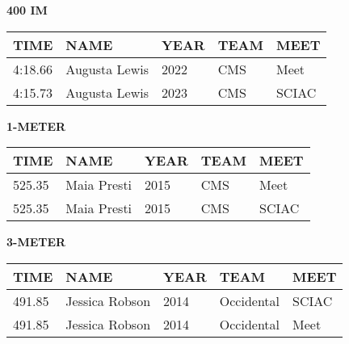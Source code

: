 \begin{table}[H]
\centering
\begin{minipage}[t]{0.6\textwidth}
\centering
\textbf{400 IM}\\[0.1cm]
\begin{tabular}{@{}p{1.8cm}p{2.8cm}p{1.2cm}p{1.4cm}p{1.4cm}@{}}
\hline
    \textbf{TIME} & \textbf{NAME} & \textbf{YEAR} & \textbf{TEAM} & \textbf{MEET} \\
\hline
    4:18.66 & Augusta Lewis & 2022 & CMS & Meet \\
    4:15.73 & Augusta Lewis & 2023 & CMS & SCIAC \\
\hline
\end{tabular}
\end{minipage}
\end{table}

\begin{table}[H]
\centering
\begin{minipage}[t]{0.6\textwidth}
\centering
\textbf{1-METER}\\[0.1cm]
\begin{tabular}{@{}p{1.8cm}p{2.8cm}p{1.2cm}p{1.4cm}p{1.4cm}@{}}
\hline
    \textbf{TIME} & \textbf{NAME} & \textbf{YEAR} & \textbf{TEAM} & \textbf{MEET} \\
\hline
    525.35 & Maia Presti & 2015 & CMS & Meet \\
    525.35 & Maia Presti & 2015 & CMS & SCIAC \\
\hline
\end{tabular}
\end{minipage}
\end{table}

\begin{table}[H]
\centering
\begin{minipage}[t]{0.6\textwidth}
\centering
\textbf{3-METER}\\[0.1cm]
\begin{tabular}{@{}p{1.8cm}p{2.8cm}p{1.2cm}p{1.4cm}p{1.4cm}@{}}
\hline
    \textbf{TIME} & \textbf{NAME} & \textbf{YEAR} & \textbf{TEAM} & \textbf{MEET} \\
\hline
    491.85 & Jessica Robson & 2014 & Occidental & SCIAC \\
    491.85 & Jessica Robson & 2014 & Occidental & Meet \\
\hline
\end{tabular}
\end{minipage}
\end{table}

